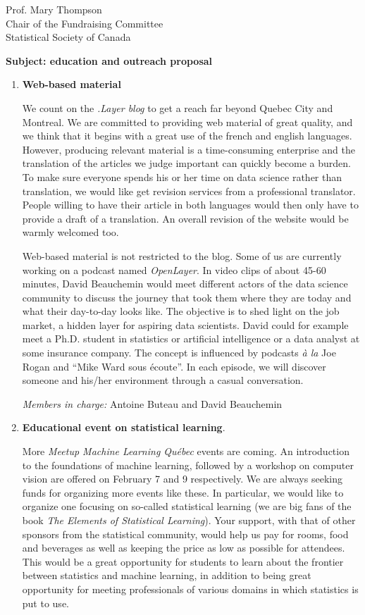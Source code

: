 \documentclass[11pt, a4paper]{letter} %
\begin{document}
\begin{letter}{
	Prof. Mary Thompson\\
	Chair of the Fundraising Committee\\
	Statistical Society of Canada
	
	\bigskip
	\textbf{Subject: education and outreach proposal}%
}
\begin{enumerate}
	\bigskip
	\emph{Member in charge:} Stéphane Caron\\
	
	\item \textbf{Web-based material}
	
	\quad We count on the \emph{.Layer blog} to get a reach far beyond Quebec City and Montreal. We are committed to providing web material of great quality, and we think that it begins with a great use of the french and english languages. However, producing relevant material is a time-consuming enterprise and the translation of the articles we judge important can quickly become a burden. To make sure everyone spends his or her time on data science rather than translation, we would like get revision services from a professional translator. People willing to have their article in both languages would then only have to provide a draft of a translation. An overall revision of the website would be warmly welcomed too.
	
	\quad Web-based material is not restricted to the blog. Some of us are currently working on a podcast named \emph{OpenLayer}. In video clips of about 45-60 minutes, David Beauchemin would meet different actors of the data science community to discuss the journey that took them where they are today and what their day-to-day looks like. The objective is to shed light on the job market, a hidden layer for aspiring data scientists. David could for example meet a Ph.D. student in statistics or artificial intelligence or a data analyst at some insurance company. The concept is influenced by podcasts \emph{à la} Joe Rogan and ``Mike Ward sous écoute''. In each episode, we will discover someone and his/her environment through a casual conversation.
	
	\bigskip
	\emph{Members in charge:} Antoine Buteau and David Beauchemin\\
	
	\item \textbf{Educational event on statistical learning}.
	
	\quad More \emph{Meetup Machine Learning Québec} events are coming. An introduction to the foundations of machine learning, followed by a workshop on computer vision are offered on February 7 and 9 respectively. We are always seeking funds for organizing more events like these. In particular, we would like to organize one focusing on so-called statistical learning (we are big fans of the book \emph{The Elements of Statistical Learning}). Your support, with that of other sponsors from the statistical community, would help us pay for rooms, food and beverages as well as keeping the price as low as possible for attendees. This would be a great opportunity for students to learn about the frontier between statistics and machine learning, in addition to being great opportunity for meeting professionals of various domains in which statistics is put to use.


\end{enumerate}
\end{letter}
\end{document}

